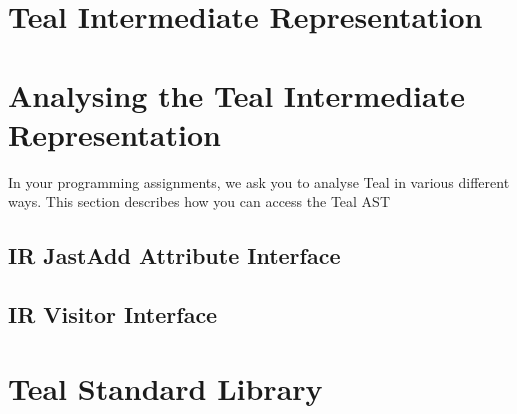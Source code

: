 \documentclass{article}
\begin{document}
\section{Teal Intermediate Representation}

\section{Analysing the Teal Intermediate Representation}
In your programming assignments, we ask you to analyse Teal in various different ways.
This section describes how you can access the Teal AST

\subsection{IR JastAdd Attribute Interface}

\subsection{IR Visitor Interface}

\section{Teal Standard Library}
\end{document}
